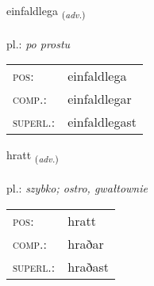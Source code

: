 \documentclass[frontgrid, backgrid]{flacards}\usepackage[]{graphicx}\usepackage[]{xcolor}
\begin{document}
\renewcommand{\flhead}{\vskip5pt \fboxsep=0pt {\small\bfseries\footnotesize Atviksorð | Adverb}}
\renewcommand{\fcfoot}{\vskip5pt \fboxsep=0pt \hspace{2pt}{\small\bfseries\footnotesize 1K}}

\renewcommand{\blhead}{\vskip5pt {\small\bfseries\footnotesize Atviksorð | Adverb }}
\renewcommand{\bcfoot}{\vskip5pt \hspace{2pt}{\small\bfseries\footnotesize 1K}}


{einfaldlega \small{\textsubscript{(\textit{adv.})}} \\[1ex] %
\textphonetic{[einfaltlɛɣa]} \\
pl.: \emph{po prostu} \\  [2ex]
\renewcommand*{\arraystretch}{0.8}
\begin{tabular}{ll}
\textsc{pos}: & einfaldlega \\ 
\textsc{comp.}: & einfaldlegar \\ 
\textsc{superl.}: & einfaldlegast \\
\end{tabular}
}

\renewcommand{\flhead}{\vskip5pt \fboxsep=0pt {\small\bfseries\footnotesize Atviksorð | Adverb}}
\renewcommand{\fcfoot}{\vskip5pt \fboxsep=0pt \hspace{2pt}{\small\bfseries\footnotesize 1K}}

\renewcommand{\blhead}{\vskip5pt {\small\bfseries\footnotesize Atviksorð | Adverb }}
\renewcommand{\bcfoot}{\vskip5pt \hspace{2pt}{\small\bfseries\footnotesize 1K}}


{hratt \small{\textsubscript{(\textit{adv.})}} \\[1ex] %
\textphonetic{[r̥aht]} \\
pl.: \emph{szybko; ostro, gwałtownie} \\  [2ex]
\renewcommand*{\arraystretch}{0.8}
\begin{tabular}{ll}
\textsc{pos}: & hratt \\ 
\textsc{comp.}: & hraðar \\ 
\textsc{superl.}: & hraðast \\
\end{tabular}
}
\end{document}

